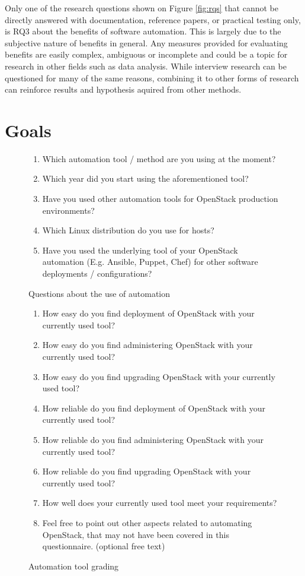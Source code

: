 \documentclass[officiallayout]{tktla}
\begin{document}
Only one of the research questions shown on Figure \ref{fig:rqs} that cannot be
directly answered with documentation, reference papers, or practical testing
only, is RQ3 about the benefits of software automation. This is largely due to
the subjective nature of benefits in general. Any measures provided for
evaluating benefits are easily complex, ambiguous or incomplete and could be a
topic for research in other fields such as data analysis. While interview
research can be questioned for many of the same reasons, combining it to other
forms of research can reinforce results and hypothesis aquired from other
methods.

\section{Goals}

\begin{figure}[t]
\centering
\begin{enumerate}
  \itemsep0em
  \item Which automation tool / method are you using at the moment?
  \item Which year did you start using the aforementioned tool?
  \item Have you used other automation tools for OpenStack production
        environments?
  \item Which Linux distribution do you use for hosts?
  \item Have you used the underlying tool of your OpenStack automation (E.g.
        Ansible, Puppet, Chef) for other software deployments / configurations?
\end{enumerate}
\caption{Questions about the use of automation}
\label{fig:questionnaire-tool-details}
\end{figure}

\begin{figure}[t]
\begin{enumerate}
  \itemsep0em
  \item How easy do you find deployment of OpenStack with your currently used
        tool?
  \item How easy do you find administering OpenStack with your currently used
        tool?
  \item How easy do you find upgrading OpenStack with your currently used tool?
  \item How reliable do you find deployment of OpenStack with your currently
        used tool?
  \item How reliable do you find administering OpenStack with your currently
        used tool?
  \item How reliable do you find upgrading OpenStack with your currently used
        tool?
  \item How well does your currently used tool meet your requirements?
  \item Feel free to point out other aspects related to automating OpenStack,
        that may not have been covered in this questionnaire. (optional free
        text)
\end{enumerate}
\caption{Automation tool grading}
\label{fig:questionnaire-grading}
\end{figure}
\end{document}
